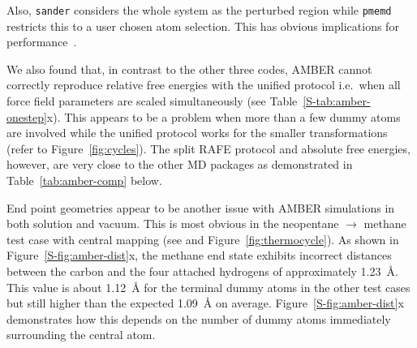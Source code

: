\documentclass[journal=jctcce,manuscript=article]{achemso}
\newcommand{\progname}[1]{\texttt{#1}}
\begin{document}
Also, \progname{sander} considers the whole system as the perturbed
region while \progname{pmemd} restricts this to a user chosen atom selection.  
This has obvious implications for performance~\cite{doi:10.1021/ct400340s}.

We also found that, in contrast to the other three codes, AMBER cannot
correctly reproduce relative free energies with the unified protocol i.e.\
when all force field parameters are scaled simultaneously (see 
Table~\ref{S-tab:amber-onestep}x).  This appears to be a problem when more than 
a few dummy atoms are involved while the unified protocol works for the smaller 
transformations (refer to Figure~\ref{fig:cycles}).  The split RAFE 
protocol and absolute free energies, however, are very close to the other MD 
packages as demonstrated in Table~\ref{tab:amber-comp} below.

End point geometries appear to be another issue with AMBER simulations
in both solution and vacuum.  This is most obvious in the neopentane 
$\rightarrow$ methane test case with central mapping (see 
 and Figure~\ref{fig:thermocycle}).
As shown in Figure~\ref{S-fig:amber-dist}x, the methane end state exhibits 
incorrect distances between the carbon and the four 
attached hydrogens of approximately \SI{1.23}{\angstrom}.  This value is about 
\SI{1.12}{\angstrom} for the terminal dummy atoms in the other test cases but 
still higher than the expected \SI{1.09}{\angstrom} on average.  
Figure~\ref{S-fig:amber-dist}x demonstrates how this depends on the number of 
dummy atoms immediately surrounding the central atom.
\end{document}
